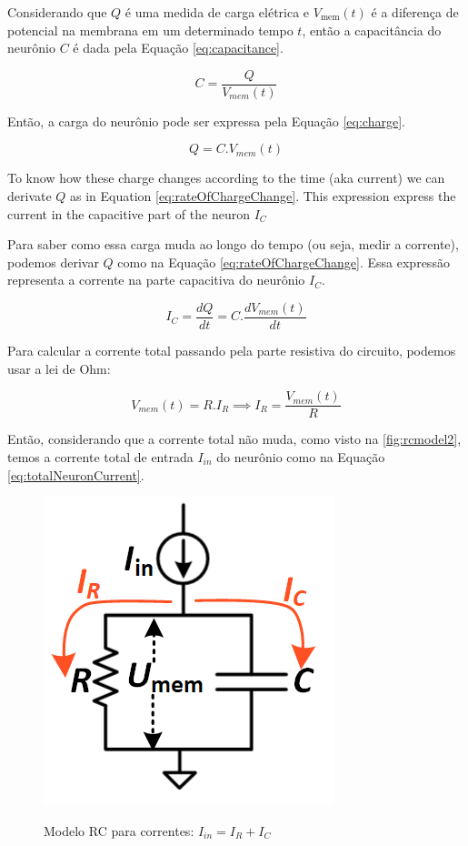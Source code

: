 			\par Considerando que $Q$ é uma medida de carga elétrica e $V_{\text{mem}}(t)$ é a diferença de potencial na membrana em um determinado tempo $t$, então a capacitância do neurônio $C$ é dada pela Equação \autoref{eq:capacitance}.
			
			\begin{equation}
				\label{eq:capacitance}
				C = \frac{Q}{V_{mem}(t)}
			\end{equation}
			
			\par Então, a carga do neurônio pode ser expressa pela Equação \autoref{eq:charge}.
			
			\begin{equation}
				\label{eq:charge}
				Q = C.V_{mem}(t)
			\end{equation}
			
			\par To know how these charge changes according to the time (aka current) we can derivate $Q$ as in Equation \autoref{eq:rateOfChargeChange}. This expression express the current in the capacitive part of the neuron $I_C$
			
			\par Para saber como essa carga muda ao longo do tempo (ou seja, medir a corrente), podemos derivar $Q$ como na Equação \autoref{eq:rateOfChargeChange}. Essa expressão representa a corrente na parte capacitiva do neurônio $I_C$.
			
			\begin{equation}
				\label{eq:rateOfChargeChange}
				I_C = \dfrac{dQ}{dt} = C. \dfrac{dV_{mem}(t)}{dt}
			\end{equation}
			
			\par Para calcular a corrente total passando pela parte resistiva do circuito, podemos usar a lei de Ohm:
			
			\begin{equation}
				\label{eq:ohmlaw}
				V_{mem}(t) = R.I_R \implies I_R = \frac{V_{mem}(t)}{R}
			\end{equation}
			
			\par Então, considerando que a corrente total não muda, como visto na  \autoref{fig:rcmodel2}, temos a corrente total de entrada $I_{in}$ do neurônio como na Equação \autoref{eq:totalNeuronCurrent}.
			
			\begin{figure}[H]
				\centering
				\caption[Modelo RC para correntes]{Modelo RC para correntes: $I_{in} = I_R + I_C$}
				\includegraphics[width=0.3\linewidth]{images/rcmodel2}
				\label{fig:rcmodel2}
			\end{figure}
			
